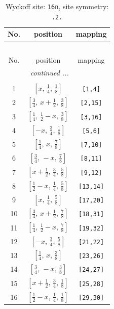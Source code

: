 \documentclass[fleqn,8pt]{jsarticle}
\begin{document}
\renewcommand{\arraystretch}{1.2}
\begin{longtable}{ccc}
\caption{Wyckoff site: {\tt 16n}, site symmetry: {\tt .2.}}
 \\
 \hline \hline
No. & position & mapping \\ \hline \endfirsthead

\multicolumn{2}{l}{\tablename\ \thetable{}} \\
 \hline \hline
No. & position & mapping \\ \hline \endhead

 \hline \hline
\multicolumn{2}{r}{\footnotesize\it continued ...} \\ \endfoot

 \hline \hline
\multicolumn{2}{r}{} \\ \endlastfoot

1 & $\left[ x,\, \frac{1}{4},\, \frac{1}{8} \right]$ & {\tt [1,4]} \\ \hline
2 & $\left[ \frac{3}{4},\, x + \frac{1}{2},\, \frac{3}{8} \right]$ & {\tt [2,15]} \\ \hline
3 & $\left[ \frac{1}{4},\, \frac{1}{2} - x,\, \frac{3}{8} \right]$ & {\tt [3,16]} \\ \hline
4 & $\left[ - x,\, \frac{3}{4},\, \frac{1}{8} \right]$ & {\tt [5,6]} \\ \hline
5 & $\left[ \frac{1}{4},\, x,\, \frac{7}{8} \right]$ & {\tt [7,10]} \\ \hline
6 & $\left[ \frac{3}{4},\, - x,\, \frac{7}{8} \right]$ & {\tt [8,11]} \\ \hline
7 & $\left[ x + \frac{1}{2},\, \frac{3}{4},\, \frac{5}{8} \right]$ & {\tt [9,12]} \\ \hline
8 & $\left[ \frac{1}{2} - x,\, \frac{1}{4},\, \frac{5}{8} \right]$ & {\tt [13,14]} \\ \hline
9 & $\left[ x,\, \frac{1}{4},\, \frac{5}{8} \right]$ & {\tt [17,20]} \\ \hline
10 & $\left[ \frac{3}{4},\, x + \frac{1}{2},\, \frac{7}{8} \right]$ & {\tt [18,31]} \\ \hline
11 & $\left[ \frac{1}{4},\, \frac{1}{2} - x,\, \frac{7}{8} \right]$ & {\tt [19,32]} \\ \hline
12 & $\left[ - x,\, \frac{3}{4},\, \frac{5}{8} \right]$ & {\tt [21,22]} \\ \hline
13 & $\left[ \frac{1}{4},\, x,\, \frac{3}{8} \right]$ & {\tt [23,26]} \\ \hline
14 & $\left[ \frac{3}{4},\, - x,\, \frac{3}{8} \right]$ & {\tt [24,27]} \\ \hline
15 & $\left[ x + \frac{1}{2},\, \frac{3}{4},\, \frac{1}{8} \right]$ & {\tt [25,28]} \\ \hline
16 & $\left[ \frac{1}{2} - x,\, \frac{1}{4},\, \frac{1}{8} \right]$ & {\tt [29,30]} \\
\end{longtable}
\end{document}
